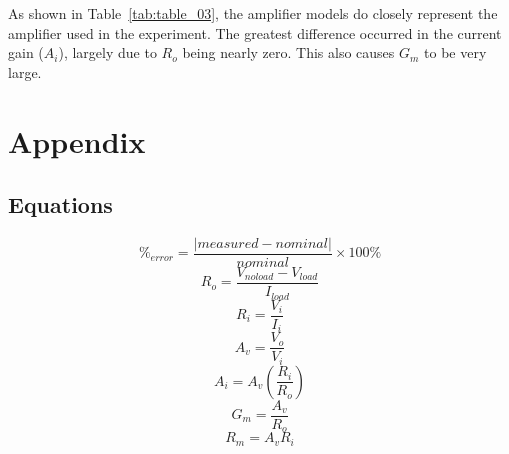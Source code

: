 \documentclass{article}
\begin{document}
As shown in Table~\ref{tab:table_03}, the amplifier models do closely
represent the amplifier used in the experiment.  The greatest
difference occurred in the current gain ($A_i$), largely due to $R_o$
being nearly zero.  This also causes $G_m$ to be very large.

\section{Appendix}
\label{sec:appendix}

\subsection*{Equations}

\begin{equation}
  \label{eqn:percent_error}
  \%_{error} = \frac{|measured - nominal|}{nominal} \times 100\%
\end{equation}
%
\begin{equation}
  \label{eqn:R_o}
  R_o = \frac{V_{noload} - V_{load}}{I_{load}}
\end{equation}
%
\begin{equation}
  \label{eqn:R_i}
  R_i = \frac{V_i}{I_i}
\end{equation}
%
\begin{equation}
  \label{eqn:A_v}
  A_v = \frac{V_o}{V_i}
\end{equation}
%
\begin{equation}
  \label{eqn:A_i}
  A_i = A_v \left(\frac{R_i}{R_o}\right)
\end{equation}
%
\begin{equation}
  \label{eqn:G_m}
  G_m = \frac{A_v}{R_o}
\end{equation}
%
\begin{equation}
  \label{eqn:R_m}
  R_m = A_v R_i
\end{equation}
\end{document}
